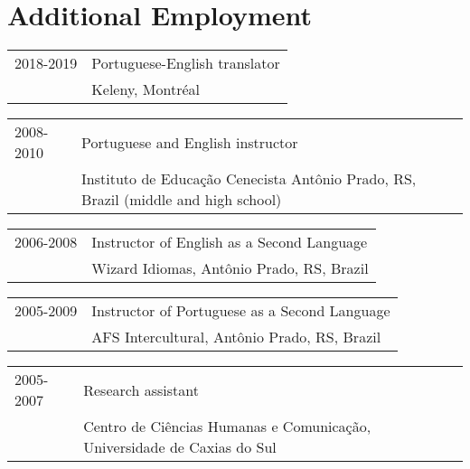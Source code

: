 \documentclass[letterpaper,10pt]{article}
\begin{document}
\vspace{0.3cm}





\section{Additional Employment}

\begin{tabular}{p{2.5cm}p{14.6cm}}
2018-2019      & Portuguese-English translator\\
                & Keleny, Montr\'eal
\end{tabular}

\begin{tabular}{p{2.5cm}p{14.6cm}}
2008-2010       & Portuguese and English instructor\\
                & Instituto de Educa\c{c}\~ao Cenecista Ant\^onio Prado, RS, Brazil (middle and high school)
\end{tabular}

\begin{tabular}{p{2.5cm}p{14.6cm}}
2006-2008       & Instructor of English as a Second Language\\
                & Wizard Idiomas, Ant\^onio Prado, RS, Brazil
\end{tabular}


\begin{tabular}{p{2.5cm}p{14.6cm}}
2005-2009       & Instructor of Portuguese as a Second Language\\
                & AFS Intercultural, Ant\^onio Prado, RS, Brazil
\end{tabular}

\begin{tabular}{p{2.5cm}p{14.6cm}}
2005-2007 & Research assistant\\
    & Centro de Ci\^encias Humanas e Comunica\c{c}\~ao, Universidade de Caxias do Sul 
\end{tabular}

\vspace{0.3cm}
\end{document}
